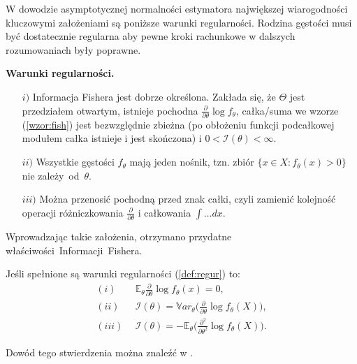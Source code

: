 W dowodzie asymptotycznej normalności estymatora największej wiarogodności kluczowymi założeniami są poniższe warunki regularności. Rodzina gęstości musi być dostatecznie regularna aby pewne kroki rachunkowe w dalszych rozumowaniach były
poprawne.

\begin{definition}\label{def:regur}
\textbf{Warunki regularności.}
\end{definition}
\begin{itemize}
\item[$i)$] Informacja Fishera jest dobrze określona. Zakłada się, że $\Theta$ jest przedziałem
otwartym, istnieje pochodna $\frac{\partial}{\partial\theta}\log f_{\theta}$, całka/suma we wzorze
(\ref{wzor:fish}) jest bezwzględnie zbieżna (po obłożeniu funkcji podcałkowej modułem całka istnieje i jest skończona) i $0 < \mathcal{I}(\theta) < \infty$.
\item[$ii)$] Wszystkie gęstości $f_\theta$ mają jeden nośnik, tzn. zbiór $\{x \in X : f_\theta(x) > 0\}$ nie zależy~od~$\theta$.
\item[$iii)$] Można przenosić pochodną przed znak całki, czyli zamienić kolejność
operacji różniczkowania $\frac{\partial}{\partial\theta}$ i całkowania $\int \dots dx$.
\end{itemize}

Wprowadzając takie założenia, otrzymano przydatne właściwości~Informacji~Fishera.

\begin{proposition}\label{prop:warunki}
Jeśli spełnione są warunki regularności (\ref{def:regur}) to:
\begin{align*}
(i) \ & \ \mathbb{E}_\theta\frac{\partial}{\partial\theta}\log f_{\theta}(x) = 0, \\
(ii) \ & \ \mathcal{I}(\theta) = \mathbb{V}ar_{\theta}\Big(\frac{\partial}{\partial\theta}\log f_{\theta}(X) \Big), \\
(iii) \ & \ \mathcal{I}(\theta) = -\mathbb{E}_{\theta}\Big(\frac{\partial^2}{\partial\theta^2}\log f_\theta(X) \Big).
\end{align*}
\end{proposition}

Dowód tego stwierdzenia można znaleźć w \cite{niemiro}.

